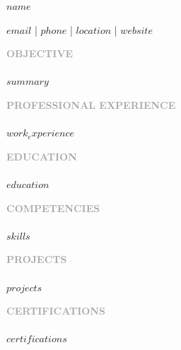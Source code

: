 \documentclass[11pt]{article}
\newcommand{\Name}[1]{{\fontsize{18pt}{20pt}\selectfont\textbf{#1}}}
\newcommand{\Section}[1]{{\textbf{\textcolor{darkgray}{\large #1}}\\\textcolor{darkgray}{\hrulefill}\\}}
\begin{document}
\centerline{\Name{$name$}}
\centerline{\small $email$ | $phone$ | $location$ | $website$}
{
\vspace{6pt}
\Section{OBJECTIVE}
$summary$
}

{\Section{PROFESSIONAL EXPERIENCE}
$work_experience$
}

{\Section{EDUCATION}
$education$
}

{\Section{COMPETENCIES}
$skills$
}

{\Section{PROJECTS}
$projects$
}

{\Section{CERTIFICATIONS}
$certifications$
}
\end{document}
